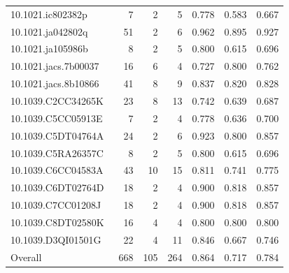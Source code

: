 \begin{table}[t]
{\begin{tabular}{lrrrrrr}
10.1021.ic802382p~\cite{prakash_metalorganic_2009}             &  7 &  2 &  5 & 0.778 & 0.583 & 0.667 \\
10.1021.ja042802q~\cite{sudik_design_2005}                     & 51 &  2 &  6 & 0.962 & 0.895 & 0.927 \\
10.1021.ja105986b~\cite{zheng_cubic_2010}                      &  8 &  2 &  5 & 0.800 & 0.615 & 0.696 \\
10.1021.jacs.7b00037~\cite{zhang_controlled_2017}              & 16 &  6 &  4 & 0.727 & 0.800 & 0.762 \\
10.1021.jacs.8b10866~\cite{zhang_self-assembly_2018}           & 41 &  8 &  9 & 0.837 & 0.820 & 0.828 \\
10.1039.C2CC34265K~\cite{du_giant_2012}                        & 23 &  8 & 13 & 0.742 & 0.639 & 0.687 \\
10.1039.C5CC05913E~\cite{augustyniak_vanadium_2015}            &  7 &  2 &  4 & 0.778 & 0.636 & 0.700 \\
10.1039.C5DT04764A~\cite{zhang_polyoxovanadate-based_2016}     & 24 &  2 &  6 & 0.923 & 0.800 & 0.857 \\
10.1039.C5RA26357C~\cite{chen_synthesis_2016}                  &  8 &  2 &  5 & 0.800 & 0.615 & 0.696 \\
10.1039.C6CC04583A~\cite{zhang_anderson-like_2016}             & 43 & 10 & 15 & 0.811 & 0.741 & 0.775 \\
10.1039.C6DT02764D~\cite{zhang_synthesis_2016}                 & 18 &  2 &  4 & 0.900 & 0.818 & 0.857 \\
10.1039.C7CC01208J~\cite{zhang_self-assembly_2017}             & 18 &  2 &  4 & 0.900 & 0.818 & 0.857 \\
10.1039.C8DT02580K~\cite{gong_functionalized_2018}             & 16 &  4 &  4 & 0.800 & 0.800 & 0.800 \\
10.1039.D3QI01501G~\cite{yang_efficient_2023}                  & 22 &  4 & 11 & 0.846 & 0.667 & 0.746 \\
\hline
Overall                                                         & 668 & 105 & 264 & 0.864 & 0.717 & 0.784 \\
\hline
\end{tabular}
}
\end{table}






